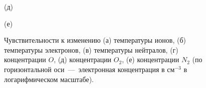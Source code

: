 \documentclass[14pt, a4paper, fleqn]{extarticle}
\begin{document}
\begin{figure}[H]

(д)
\end{figure}

\begin{figure}[H]

(е)
\caption{Чувствительности к изменению (а) температуры ионов, (б) температуры электронов, (в) температуры нейтралов, (г) концентрации $O$, (д) концентрации $O_2$, (е) концентрации $N_2$ (по горизонтальной оси~---~электронная концентрация в см$^{-3}$ в логарифмическом масштабе).}
\end{figure}
\end{document}

